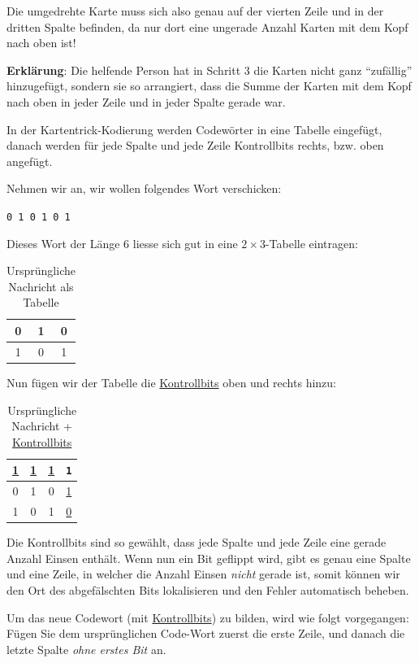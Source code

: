 Die umgedrehte Karte muss sich also genau auf der vierten Zeile und in der dritten Spalte befinden, da nur dort eine ungerade Anzahl Karten mit dem Kopf nach oben ist! 

\textbf{Erklärung}: Die helfende Person hat in Schritt 3 die Karten nicht ganz \enquote{zufällig} hinzugefügt, sondern sie so arrangiert, dass die Summe der Karten mit dem Kopf nach oben in jeder Zeile und in jeder Spalte gerade war.

\begin{mydefinition}[Kartentrick]\label{def:kartentrick}
In der Kartentrick-Kodierung werden Codewörter in eine Tabelle eingefügt, danach werden für jede Spalte und jede Zeile Kontrollbits rechts, bzw. oben angefügt.

Nehmen wir an, wir wollen folgendes Wort verschicken:

\texttt{0 1 0 1 0 1}

Dieses Wort der Länge 6 liesse sich gut in eine $2\times3$-Tabelle eintragen:

\begin{table}[H]
\centering
\begin{tabular}{c|c|c}
0 & 1 & 0 \\\midrule
1 & 0 & 1 \\
\end{tabular}
\caption{Ursprüngliche Nachricht als Tabelle}
\label{tab:ex-zauberer}
\end{table}

Nun fügen wir der Tabelle die \underline{Kontrollbits} oben und rechts hinzu:
\begin{table}[H]
\centering
\begin{tabular}{c|c|c||c}
\underline{1} & \underline{1} & \underline{1} & \texttt{1}\\\midrule\midrule
0 & 1 & 0 & \underline{1}\\\midrule
1 & 0 & 1 & \underline{0}\\
\end{tabular}
\caption{Ursprüngliche Nachricht + \underline{Kontrollbits}}
\label{tab:ex-zauberer-parity}
\end{table}

Die Kontrollbits sind so gewählt, dass jede Spalte und jede Zeile eine gerade Anzahl Einsen enthält. Wenn nun ein Bit geflippt wird, gibt es genau eine Spalte und eine Zeile, in welcher die Anzahl Einsen \textit{nicht} gerade ist, somit können wir den Ort des abgefälschten Bits lokalisieren und den Fehler automatisch beheben.

Um das neue Codewort (mit \underline{Kontrollbits}) zu bilden, wird wie folgt vorgegangen: Fügen Sie dem ursprünglichen Code-Wort zuerst die erste Zeile, und danach die letzte Spalte \textit{ohne erstes Bit} an.

\end{mydefinition}

